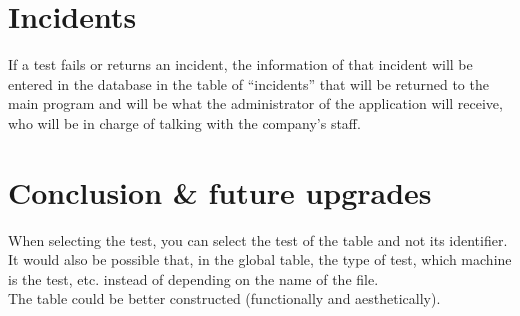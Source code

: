 \documentclass[12pt,letterpaper]{article}
\begin{document}
	\section{Incidents}
	If a test fails or returns an incident, the information of that incident will be entered in the database in the table of ``incidents'' that will be returned to the main program and will be what the administrator of the application will receive, who will be in charge of talking with the company's staff.
	
	\section{Conclusion \& future upgrades}
	When selecting the test, you can select the test of the table and not its identifier. \\
	
\noindent	
It would also be possible that, in the global table, the type of test, which machine is the test, etc. instead of depending on the name of the file. \\

\noindent
The table could be better constructed (functionally and aesthetically).
\end{document}
